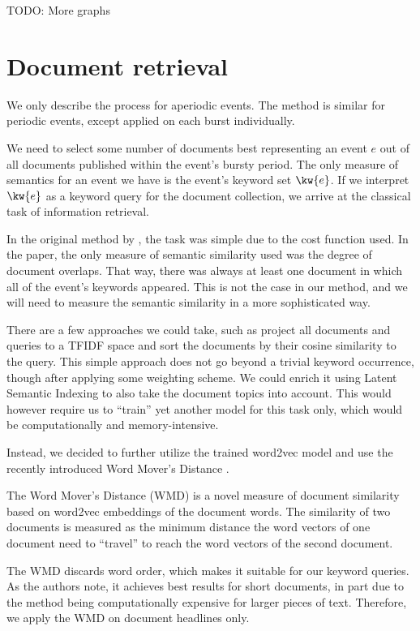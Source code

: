 {\color{red} TODO: More graphs}


\section{Document retrieval}
We only describe the process for aperiodic events. The method is similar for periodic events, except applied on each burst individually.

We need to select some number of documents best representing an event $e$ out of all documents published within the event's bursty period. The only measure of semantics for an event we have is the event's keyword set $\kw{e}$. If we interpret $\kw{e}$ as a keyword query for the document collection, we arrive at the classical task of information retrieval.

In the original method by \cite{event-detection}, the task was simple due to the cost function used. In the paper, the only measure of semantic similarity used was the degree of document overlaps. That way, there was always at least one document in which all of the event's keywords appeared. This is not the case in our method, and we will need to measure the semantic similarity in a more sophisticated way.

There are a few approaches we could take, such as project all documents and queries to a TFIDF space \cite{information-retrieval} and sort the documents by their cosine similarity to the query. This simple approach does not go beyond a trivial keyword occurrence, though after applying some weighting scheme. We could enrich it using Latent Semantic Indexing \cite{lsi} to also take the document topics into account. This would however require us to ``train'' yet another model for this task only, which would be computationally and memory-intensive.

Instead, we decided to further utilize the trained word2vec model and use the recently introduced Word Mover's Distance \cite{wmd}.

The Word Mover's Distance (WMD) is a novel measure of document similarity based on word2vec embeddings of the document words. The similarity of two documents is measured as the minimum distance the word vectors of one document need to ``travel'' to reach the word vectors of the second document.

The WMD discards word order, which makes it suitable for our keyword queries. As the authors note, it achieves best results for short documents, in part due to the method being computationally expensive for larger pieces of text. Therefore, we apply the WMD on document headlines only.

